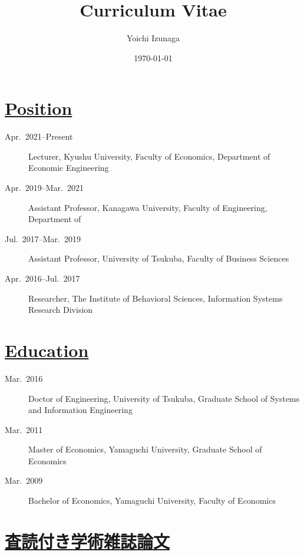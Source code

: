 \documentclass[a4j,uplatex,9pt]{jsarticle}
\title{Curriculum Vitae}
\author{Yoichi Izunaga}
\date{\today}
\begin{document}
\maketitle


\section*{\underline{Position}}
\begin{description}

\item[Apr.~2021--Present] Lecturer, Kyushu University, Faculty of Economics, Department of Economic Engineering

\item[Apr.~2019--Mar.~2021] Assistant Professor, Kanagawa University, Faculty of Engineering, Department of 

\item[Jul.~2017--Mar.~2019] Assistant Professor, University of Tsukuba, Faculty of Business Sciences

\item[Apr.~2016--Jul.~2017] Researcher, The Institute of Behavioral Sciences, Information Systems Research Division

\end{description}

\section*{\underline{Education}}
\begin{description}

\item[Mar.~2016] Doctor of Engineering, University of Tsukuba, Graduate School of Systems and Information Engineering

\item[Mar.~2011] Master of Economics, Yamaguchi University, Graduate School of Economics

\item[Mar.~2009] Bachelor of Economics, Yamaguchi University, Faculty of Economics

\end{description}


\section*{\underline{査読付き学術雑誌論文}}
\end{document}

